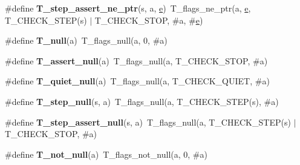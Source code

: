 \begin{DoxyCompactItemize}
\item 
\mbox{\label{group__RTEMSTestFrameworkChecksPointer_ga119507351836ffe073db083168ee27c4}} 
\#define {\bfseries T\+\_\+step\+\_\+assert\+\_\+ne\+\_\+ptr}(s,  a,  \mbox{\hyperlink{sun4u_2tte_8h_a8b0b9ed08e0e18920ec2682f48228c27}{e}})~T\+\_\+flags\+\_\+ne\+\_\+ptr(a, \mbox{\hyperlink{sun4u_2tte_8h_a8b0b9ed08e0e18920ec2682f48228c27}{e}}, T\+\_\+\+C\+H\+E\+C\+K\+\_\+\+S\+T\+EP(s) $\vert$ T\+\_\+\+C\+H\+E\+C\+K\+\_\+\+S\+T\+OP, \#a, \#\mbox{\hyperlink{sun4u_2tte_8h_a8b0b9ed08e0e18920ec2682f48228c27}{e}})
\item 
\mbox{\label{group__RTEMSTestFrameworkChecksPointer_ga13b26922fe705b68ed7ab200c2e897d8}} 
\#define {\bfseries T\+\_\+null}(a)~T\+\_\+flags\+\_\+null(a, 0, \#a)
\item 
\mbox{\label{group__RTEMSTestFrameworkChecksPointer_ga230fcf454553e91f620c103f721f65ab}} 
\#define {\bfseries T\+\_\+assert\+\_\+null}(a)~T\+\_\+flags\+\_\+null(a, T\+\_\+\+C\+H\+E\+C\+K\+\_\+\+S\+T\+OP, \#a)
\item 
\mbox{\label{group__RTEMSTestFrameworkChecksPointer_ga5126afbac69f2f00f8546f1237f25abb}} 
\#define {\bfseries T\+\_\+quiet\+\_\+null}(a)~T\+\_\+flags\+\_\+null(a, T\+\_\+\+C\+H\+E\+C\+K\+\_\+\+Q\+U\+I\+ET, \#a)
\item 
\mbox{\label{group__RTEMSTestFrameworkChecksPointer_gafed14a00b111c8889fa65b552cd55749}} 
\#define {\bfseries T\+\_\+step\+\_\+null}(s,  a)~T\+\_\+flags\+\_\+null(a, T\+\_\+\+C\+H\+E\+C\+K\+\_\+\+S\+T\+EP(s), \#a)
\item 
\mbox{\label{group__RTEMSTestFrameworkChecksPointer_gad03c64b4a93e49bec444374e09272598}} 
\#define {\bfseries T\+\_\+step\+\_\+assert\+\_\+null}(s,  a)~T\+\_\+flags\+\_\+null(a, T\+\_\+\+C\+H\+E\+C\+K\+\_\+\+S\+T\+EP(s) $\vert$ T\+\_\+\+C\+H\+E\+C\+K\+\_\+\+S\+T\+OP, \#a)
\item 
\mbox{\label{group__RTEMSTestFrameworkChecksPointer_gaf9bdec32799cd4e4c740d6c6f0ce425e}} 
\#define {\bfseries T\+\_\+not\+\_\+null}(a)~T\+\_\+flags\+\_\+not\+\_\+null(a, 0, \#a)

\end{DoxyCompactItemize}
